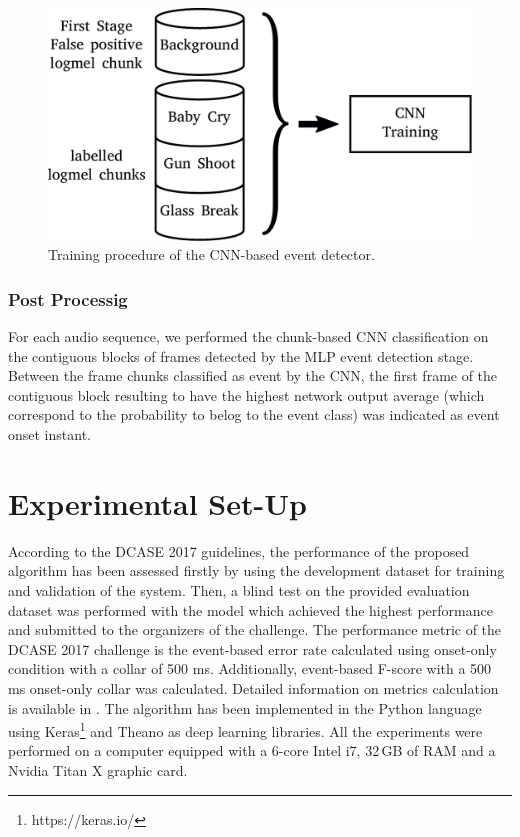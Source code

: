 \documentclass{article}
\begin{document}
\begin{sloppy}
\begin{figure}[b]
	\centering
	\includegraphics[width=\columnwidth]{Images/training_second_stage.pdf}
	\caption{Training procedure of the CNN-based event detector.}
	\label{fig:CNN-train}
\end{figure}


\subsubsection{Post Processig }
For each audio sequence, we performed the chunk-based CNN classification on the contiguous blocks of frames detected by the MLP event detection stage. Between the frame chunks classified as event by the CNN, %
the first frame of the contiguous block resulting to have the highest network output average (which correspond to the probability to belog to the event class) was indicated as event onset instant.

\section{Experimental Set-Up}
\label{sec:experiment}
According to the DCASE 2017 guidelines, the performance of the proposed algorithm has been assessed firstly by using the development dataset for training and validation of the system. Then, a blind test on the provided evaluation dataset was performed with the model which achieved the highest performance and submitted to the organizers of the challenge. The performance metric of the DCASE 2017 challenge is the event-based error rate calculated using onset-only condition with a collar of 500 ms. Additionally, event-based F-score with a 500 ms onset-only collar was calculated. Detailed information on metrics calculation is available in \cite{Mesaros2016_MDPI}. The algorithm has been implemented in the Python language using Keras\footnote{https://keras.io/} and Theano \cite{Theano2016short} as deep learning libraries. All the experiments were performed on a computer equipped with a 6-core Intel i7, 32\,GB of RAM and a Nvidia Titan X graphic card.


\end{sloppy}
\end{document}
